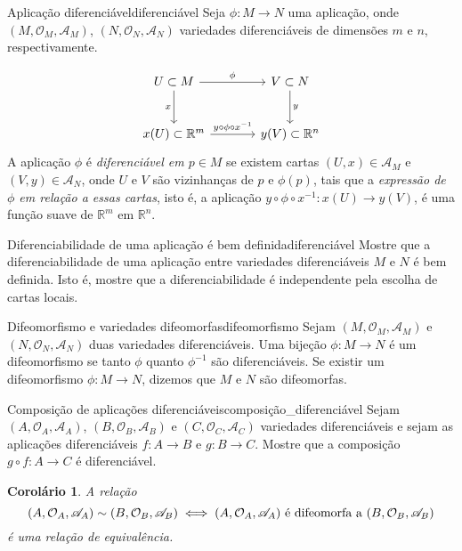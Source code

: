 \documentclass[12pt,a4paper]{article}
\numberwithin{equation}{section}
\newcommand\manifold[1]{\ensuremath{\left(#1, \mathcal{O}_{#1}, \mathscr{A}_{#1}\right)}}
\newtheorem{corollary}{Corolário}[section]
\begin{document}
\begin{definition}{Aplicação diferenciável}{diferenciável}
    Seja \(\phi : M \to N\) uma aplicação, onde \manifold{M}, \manifold{N} variedades diferenciáveis de dimensões \(m\) e \(n\), respectivamente.

    \begin{equation*}
        \begin{tikzcd}[column sep = large, row sep = large]
            U \subset M\arrow[swap]{d}{x} \arrow{r}{\phi} & V \subset N\arrow{d}{y}\\
            x(U) \subset \mathbb{R}^m \arrow{r}{y \circ \phi\circ x^{-1}} & y(V) \subset \mathbb{R}^n
        \end{tikzcd}
    \end{equation*}
    A aplicação \(\phi\) é \emph{diferenciável em \(p \in M\)} se existem cartas \((U,x) \in \mathscr{A}_M\) e \((V,y)\in \mathscr{A}_N\), onde \(U\) e \(V\) são vizinhanças de \(p\) e \(\phi(p)\), tais que a \emph{expressão de \(\phi\) em relação a essas cartas}, isto é, a aplicação \(y \circ \phi \circ x^{-1} : x(U) \to y(V)\), é uma função suave de \(\mathbb{R}^m\) em \(\mathbb{R}^n\).
\end{definition}
\begin{exercício}{Diferenciabilidade de uma aplicação é bem definida}{diferenciável}
    Mostre que a diferenciabilidade de uma aplicação entre variedades diferenciáveis \(M\) e \(N\) é bem definida. Isto é, mostre que a diferenciabilidade é independente pela escolha de cartas locais.
\end{exercício}

\begin{definition}{Difeomorfismo e variedades difeomorfas}{difeomorfismo}
    Sejam \manifold{M} e \manifold{N} duas variedades diferenciáveis. Uma bijeção \(\phi : M \to N\) é um difeomorfismo se tanto \(\phi\) quanto \(\phi^{-1}\) são diferenciáveis. Se existir um difeomorfismo \(\phi : M \to N\), dizemos que \(M\) e \(N\) são difeomorfas.
\end{definition}

\begin{exercício}{Composição de aplicações diferenciáveis}{composição_diferenciável}
    Sejam \manifold{A}, \manifold{B} e \manifold{C} variedades diferenciáveis e sejam as aplicações diferenciáveis \(f : A \to B\) e \(g : B \to C\). Mostre que a composição \(g \circ f : A \to C\) é diferenciável.
\end{exercício}

\begin{corollary}
    \label{col:difeomorfo}
    A relação \[\manifold{A} \sim \manifold{B} \iff \text{\manifold{A} é difeomorfa a \manifold{B}}\] é uma relação de equivalência.
\end{corollary}
\end{document}
